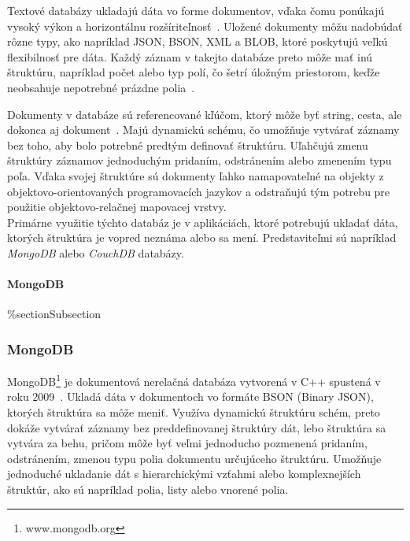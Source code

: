 Textové databázy ukladajú dáta vo forme dokumentov, vďaka čomu ponúkajú vysoký výkon a horizontálnu rozšíriteľnosť~\cite{NoSQLDBvsRealtionDB}. Uložené dokumenty môžu nadobúdať rôzne typy, ako napríklad JSON, BSON, XML a BLOB, ktoré poskytujú veľkú flexibilnosť pre dáta. Každý záznam v takejto databáze preto môže mať inú štruktúru, napríklad počet alebo typ polí, čo šetrí úložným priestorom, keďže neobsahuje nepotrebné prázdne polia~\cite{NoSQLDBvsRealtionDB}.

Dokumenty v databáze sú referencované kľúčom, ktorý môže byť string, cesta, ale dokonca aj dokument~\cite{NoSQLDBvsRealtionDB}. Majú dynamickú schému, čo umožňuje vytvárať záznamy bez toho, aby bolo potrebné predtým definovať štruktúru. Uľahčujú zmenu štruktúry záznamov jednoduchým pridaním, odstránením alebo zmenením typu poľa. Vďaka svojej štruktúre sú dokumenty ľahko namapovateľné na objekty z objektovo-orientovaných programovacích jazykov a odstraňujú tým potrebu pre použitie objektovo-relačnej mapovacej vrstvy.
\\

Primárne využitie týchto databáz je v aplikáciách, ktoré potrebujú ukladať dáta, ktorých štruktúra je vopred neznáma alebo sa mení. Predstaviteľmi sú napríklad \textit{MongoDB} alebo \textit{CouchDB} databázy.

%
%
{
	\paragraph{MongoDB}
}
{
	\%section{Subsection}
	\subsubsection{MongoDB}
}
\label{subsection:mongodb}
MongoDB\footnote{www.mongodb.org} je dokumentová nerelačná databáza vytvorená v C++ spustená v roku 2009~\cite{NoSQLDBvsRealtionDB}. Ukladá dáta v dokumentoch vo formáte BSON (Binary JSON), ktorých štruktúra sa môže meniť. Využíva dynamickú štruktúru schém, preto dokáže vytvárať záznamy bez preddefinovanej štruktúry dát, lebo štruktúra sa vytvára za behu, pričom môže byť veľmi jednoducho pozmenená pridaním, odstránením, zmenou typu polia dokumentu určujúceho štruktúru. Umožňuje jednoduché ukladanie dát s hierarchickými vzťahmi alebo komplexnejších štruktúr, ako sú napríklad polia, listy alebo vnorené polia.


